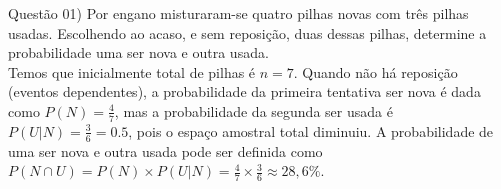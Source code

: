
\noindent \textcolor{COLOR1}{Questão 01)} Por engano misturaram-se quatro pilhas novas com três pilhas usadas. Escolhendo ao acaso, e sem  reposição, duas dessas pilhas, determine a probabilidade uma ser nova e outra usada.
\\

Temos que inicialmente total de pilhas é $n = 7$. Quando não há reposição (eventos dependentes), a probabilidade da primeira tentativa ser nova é dada como $P(N) = \frac{4}{7}$, mas a probabilidade da segunda ser usada é $P(U|N) = \frac{3}{6} = 0.5$, pois o espaço amostral total diminuiu. A probabilidade de uma ser nova e outra usada pode ser definida como $P(N\cap U)=P(N)\times P(U|N) = \frac{4}{7}\times \frac{3}{6} \approx 28,6\%$.